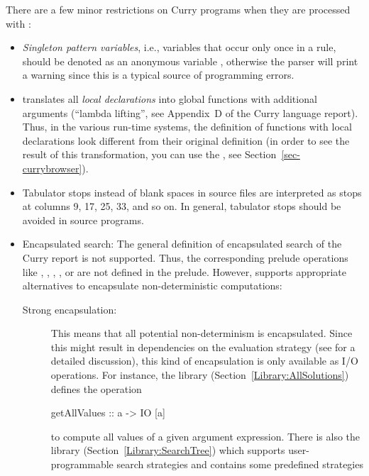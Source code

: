 There are a few minor restrictions on Curry programs
when they are processed with \CYS:
\begin{itemize}
\item
{}
\emph{Singleton pattern variables}, i.e., variables that occur only once
in a rule, should be denoted as an anonymous variable \ccode{_},
otherwise the parser will print a warning since this is a
typical source of programming errors.
\item
\CYS translates all \emph{local declarations} into global functions with
additional arguments (``lambda lifting'', see Appendix~D of the
Curry language report).
Thus, in the various run-time systems, the definition of
functions with local declarations look different from
their original definition (in order to see the result
of this transformation, you can use the \cb, see
Section~\ref{sec-currybrowser}).
\item {}
Tabulator stops instead of blank spaces in source files are
interpreted as stops at columns 9, 17, 25, 33, and so on.
In general, tabulator stops should be avoided in source programs.
\item
Encapsulated search:
The general definition of encapsulated search of the Curry report
\cite{HanusSteiner98PLILP} is not supported.
Thus, the corresponding prelude operations like
,
,
,
, or
are not defined in the \CYS prelude.
However, \CYS supports appropriate alternatives
to encapsulate non-deterministic computations:
\begin{description}
\item[Strong encapsulation:]
This means that all potential
non-determinism is encapsulated. Since this might
result in dependencies on the evaluation strategy
(see \cite{BrasselHanusHuch04JFLP} for a detailed discussion),
this kind of encapsulation is only available as I/O operations.
For instance, the library 
(Section~\ref{Library:AllSolutions})
defines the operation
\begin{curry}
getAllValues :: a -> IO [a]
\end{curry}
to compute all values of a given argument expression.
There is also the library 
(Section~\ref{Library:SearchTree})
which supports user-programmable search strategies
and contains some predefined strategies

\end{description}
\end{itemize}
